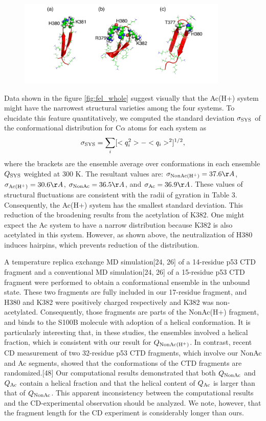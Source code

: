 \begin{figure}
  \centering
  \includegraphics[width=10cm]{../single_CTD/figures_p53ctd/7.pdf}
  \caption{\label{fig:haripin_confs_p53}}
\end{figure}

Data shown in the figure \ref{fig:fel_whole} suggest visually that the Ac(H+) system might have the narrowest structural varieties among the four systems. To elucidate this feature quantitatively, we computed the standard deviation $\sigma_{\rm SYS}$ of the conformational distribution for C$\alpha$ atoms for each system as
\begin{equation}
\label{eq:sig_ca}
\sigma_{\rm SYS} = \sum_i [<q_i^2 > - <q_i>^2]^{1/2},
\end{equation}
where the brackets are the ensemble average over conformations in each ensemble $Q_{\rm SYS}$ weighted at 300 K. The resultant values are: $\sigma_{\rm NonAc(H^+)}= 37.6 \AA $,  $\sigma_{\rm Ac(H^+)}= 30.6 \AA $,  $\sigma_{\rm NonAc}= 36.5 \AA $, and  $\sigma_{\rm Ac}= 36.9 \AA $. These values of structural fluctuations are consistent with the radii of gyration in Table 3. Consequently, the Ac(H+) system has the smallest standard deviation. This reduction of the broadening results from the acetylation of K382. One might expect the Ac system to have a narrow distribution because K382 is also acetylated in this system. However, as shown above, the neutralization of H380 induces hairpins, which prevents reduction of the distribution.

A temperature replica exchange MD simulation[24, 26] of a 14-residue p53 CTD fragment and a conventional MD simulation[24, 26] of a 15-residue p53 CTD fragment were performed to obtain a conformational ensemble in the unbound state. These two fragments are fully included in our 17-residue fragment, and H380 and K382 were positively charged respectively and K382 was non-acetylated. Consequently, those fragments are parts of the NonAc(H+) fragment, and binds to the S100B molecule with adoption of a helical conformation. It is particularly interesting that, in these studies, the ensembles involved a helical fraction, which is consistent with our result for $Q_{\rm NonAc(H^+)}$. In contrast, recent CD measurement of two 32-residue p53 CTD fragments, which involve our NonAc and Ac segments, showed that the conformations of the CTD fragments are randomized.[48] Our computational results demonstrated that both $Q_{\rm NonAc}$ and $Q_{\rm Ac}$ contain a helical fraction and that the helical content of $Q_{\rm Ac}$ is larger than that of $Q_{\rm NonAc}$. This apparent inconsistency between the computational results and the CD-experimental observation should be analyzed. We note, however, that the fragment length for the CD experiment is considerably longer than ours.

